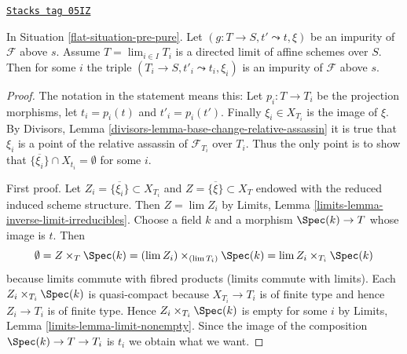 \begin{lemma}
\label{flat-lemma-impure-limit}
\href{https://stacks.math.columbia.edu/tag/05IZ}{\texttt{Stacks tag 05IZ}}

In Situation \ref{flat-situation-pre-pure}.
Let $(g : T \to S, t' \leadsto t, \xi)$ be an impurity of
$\mathcal{F}$ above $s$. Assume $T = \lim_{i \in I} T_i$
is a directed limit of affine schemes over $S$. Then for
some $i$ the triple $(T_i \to S, t'_i \leadsto t_i, \xi_i)$
is an impurity of $\mathcal{F}$ above $s$.
\end{lemma}

\begin{proof}
The notation in the statement means this: Let $p_i : T \to T_i$
be the projection morphisms, let $t_i = p_i(t)$ and $t'_i = p_i(t')$.
Finally $\xi_i \in X_{T_i}$ is the image of $\xi$. By
Divisors, Lemma \ref{divisors-lemma-base-change-relative-assassin}
it is true that $\xi_i$ is a point of the relative
assassin of $\mathcal{F}_{T_i}$ over $T_i$. Thus the only point is to
show that $\overline{\{\xi_i\}} \cap X_{t_i} = \emptyset$ for some $i$.

\medskip\noindent
First proof. Let $Z_i = \overline{\{\xi_i\}} \subset X_{T_i}$
and $Z = \overline{\{\xi\}} \subset X_T$
endowed with the reduced induced scheme structure.
Then $Z = \lim Z_i$ by
Limits, Lemma \ref{limits-lemma-inverse-limit-irreducibles}.
Choose a field $k$ and a morphism $\Spec(k) \to T$ whose image is $t$.
Then
$$
\emptyset =
Z \times_T \Spec(k) = (\lim Z_i) \times_{(\lim T_i)} \Spec(k)
= \lim Z_i \times_{T_i} \Spec(k)
$$
because limits commute with fibred products (limits commute with limits).
Each $Z_i \times_{T_i} \Spec(k)$ is quasi-compact because $X_{T_i} \to T_i$
is of finite type and hence $Z_i \to T_i$ is of finite type.
Hence $Z_i \times_{T_i} \Spec(k)$ is empty for some $i$ by
Limits, Lemma \ref{limits-lemma-limit-nonempty}.
Since the image of the composition $\Spec(k) \to T \to T_i$ is $t_i$
we obtain what we want.


\end{proof}
